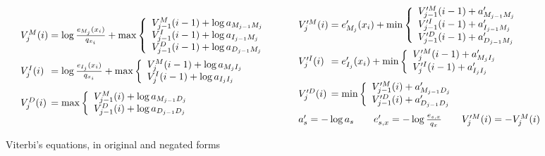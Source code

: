 \documentclass[preprint,nonatbib,blockstyle,nocopyrightspace,times]{sigplanconf}
\begin{document}
\begin{figure}
\def\goo{18pt}
\def\gum{14pt}
\[
\begin{array}{l@{}c@{}l}
V_{j}^{M}(i) &{}={}& \log\frac{e_{M_{j}}(x_{i})}{q_{x_{i}}} + \max \left\{
\begin{array}{l l}
V_{j-1}^{M}(i - 1) + \log a_{M_{j-1}M_{j}}\\
V_{j-1}^{I}(i - 1) + \log a_{I_{j-1}M_{j}}\\
V_{j-1}^{D}(i - 1) + \log a_{D_{j-1}M_{j}}\\
\end{array} \right.\\[\goo]
V_{j}^{I}(i) &=& \log\frac{e_{I_{j}}(x_{i})}{q_{x_{i}}} + \max \left\{
\begin{array}{l l}
V_{j}^{M}(i - 1) + \log a_{M_{j}I_{j}}\\
V_{j}^{I}(i - 1) + \log a_{I_{j}I_{j}}\\
\end{array} \right.\\[\gum]
V_{j}^{D}(i) &=& \max \left\{
\begin{array}{l l}
V_{j-1}^{M}(i) + \log a_{M_{j-1}D_{j}}\\
V_{j-1}^{D}(i) + \log a_{D_{j-1}D_{j}}\\
\end{array} \right.\\
\end{array}
\qquad
\begin{array}{l@{}c@{}l}
V_{j}^{\prime M}(i) &{}={}& e^{\prime}_{M_{j}}(x_{i}) + \min \left\{
\begin{array}{l l}
V_{j-1}^{\prime M}(i - 1) + a^{\prime}_{M_{j-1}M_{j}}\\
V_{j-1}^{\prime I}(i - 1) + a^{\prime}_{I_{j-1}M_{j}}\\
V_{j-1}^{\prime D}(i - 1) + a^{\prime}_{D_{j-1}M_{j}}\\
\end{array} \right.\\[\goo]
V_{j}^{\prime I}(i) &=& e^{\prime}_{I_{j}}(x_{i}) + \min \left\{
\begin{array}{l l}
V_{j}^{\prime M}(i - 1) + a^{\prime}_{M_{j}I_{j}}\\
V_{j}^{\prime I}(i - 1) + a^{\prime}_{I_{j}I_{j}}\\
\end{array} \right.\\[\gum]
V_{j}^{\prime D}(i) &=& \min \left\{
\begin{array}{l l}
V_{j-1}^{\prime M}(i) + a^{\prime}_{M_{j-1}D_{j}}\\
V_{j-1}^{\prime D}(i) + a^{\prime}_{D_{j-1}D_{j}}\\
\end{array} \right.\\[\gum]
\multicolumn3{l}{%
a'_{s} = - \log a_{s} 
\qquad
e^{\prime}_{s,x} = - \log\frac{e_{s,x}}{q_{x}}
\qquad
V_j^{\prime M}(i) = - V_j^{M}(i)
}
\\
\end{array}
\]

\caption{Viterbi's equations, in original and negated forms}
\label{viterbi}
\end{figure}
\end{document}
